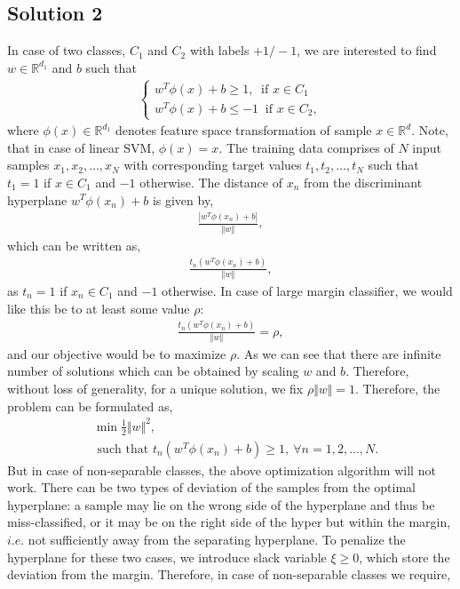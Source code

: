 \subsection*{Solution 2}
In case of two classes, $C_1$ and $C_2$ with labels $+1/-1$, we are interested to find $w \in \mathbb{R}^{d_1}$ and $b$ such that
\begin{align*}
	\begin{cases}
		w^T \phi(x) + b \geq 1,\ \text{ if } x \in C_1\\
		w^T \phi(x) + b \leq -1\ \text{ if } x \in C_2,
	\end{cases}
\end{align*}
where $\phi(x) \in \mathbb{R}^{d_1}$ denotes feature space transformation of sample $x \in \mathbb{R}^d$. Note, that in case of linear SVM, $\phi(x) = x$. The training data comprises of $N$ input samples $x_1, x_2, \ldots, x_N$ with corresponding target values $t_1, t_2, \ldots, t_N$ such that $t_1 = 1$ if $x \in C_1$ and $-1$ otherwise. The distance of $x_n$ from the discriminant hyperplane $w^T\phi(x_n)+b$ is given by,
\begin{align*}
	\frac{|w^T\phi(x_n)+b|}{\Vert w\Vert},
\end{align*}
which can be written as,
\begin{align*}
	\frac{t_n(w^T\phi(x_n) + b)}{\Vert w \Vert},
\end{align*}
as $t_n = 1$ if $x_n \in C_1$ and $-1$ otherwise. In case of large margin classifier, we would like this be to at least some value $\rho$:
\begin{align*}
	\frac{t_n(w^T\phi(x_n) + b)}{\Vert w \Vert} = \rho,
\end{align*}
and our objective would be to maximize $\rho$. As we can see that there are infinite number of solutions which can be obtained by scaling $w$ and $b$. Therefore, without loss of generality, for a unique solution, we fix $\rho \Vert w \Vert = 1$. Therefore, the problem can be formulated as,
\begin{align*}
	&\min \frac{1}{2} \Vert w \Vert^2,\\
	&\text{ such that }t_n(w^T\phi(x_n) + b) \geq 1,\  \forall n = 1,2,\ldots,N.
\end{align*}
But in case of non-separable classes, the above optimization algorithm will not work. There can be two types of deviation of the samples from the optimal hyperplane: a sample may lie on the wrong side of the hyperplane and thus be miss-classified, or it may be on the right side of the hyper but within the margin, $i.e.$ not sufficiently away from the separating hyperplane. To penalize the hyperplane for these two cases, we introduce slack variable $\xi \geq 0$, which store the deviation from the margin. Therefore, in case of non-separable classes we require,

